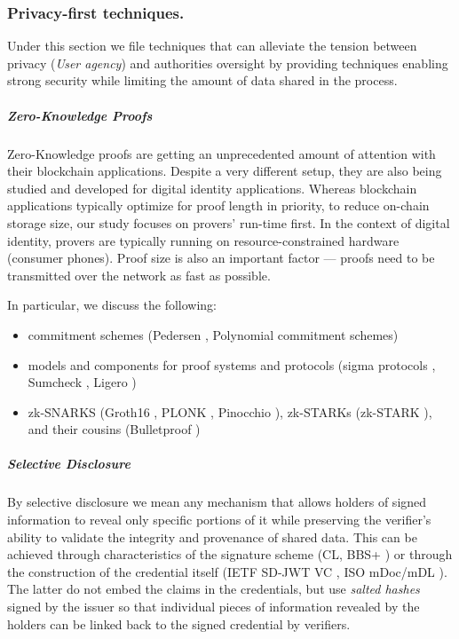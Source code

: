 \subsubsection{Privacy-first techniques.} Under this section we file techniques that can alleviate the tension between privacy (\emph{User agency}) and authorities oversight by providing techniques enabling strong security while limiting the amount of data shared in the process.

\subparagraph{Zero-Knowledge Proofs} Zero-Knowledge proofs are getting an unprecedented amount of attention with their blockchain applications. 
Despite a very different setup, they are also being studied and developed for digital identity applications.
Whereas blockchain applications typically optimize for proof length in priority, to reduce on-chain storage size, our study focuses on provers' run-time first. In the context of digital identity, provers are typically running on resource-constrained hardware (consumer phones). Proof size is also an important factor --- proofs need to be transmitted over the network as fast as possible.  

In particular, we discuss the following:

\begin{itemize}
    \item commitment schemes (Pedersen \cite{PD91}, Polynomial commitment schemes)
    \item models and components for proof systems and protocols (sigma protocols \cite{SP90}, Sumcheck \cite{LCF92}, Ligero \cite{AHIV22})
    \item zk-SNARKS (Groth16 \cite{G16}, PLONK \cite{GWC90}, Pinocchio \cite{PHGR13}), zk-STARKs (zk-STARK \cite{BCG18}), and their cousins (Bulletproof \cite{BBD18})
\end{itemize}

\subparagraph{Selective Disclosure} By selective disclosure we mean any mechanism that allows holders of signed information to reveal only specific portions of it while preserving the verifier's ability to validate the integrity and provenance of shared data. This can be achieved through characteristics of the signature scheme (CL, BBS+ \cite{ASM06}) or through the construction of the credential itself (IETF SD-JWT VC \cite{SDJWT}, ISO mDoc/mDL \cite{ISO18013-5_2021}).
The latter do not embed the claims in the credentials, but use \emph{salted hashes} signed by the issuer so that individual pieces of information revealed by the holders can be linked back to the signed credential by verifiers.

